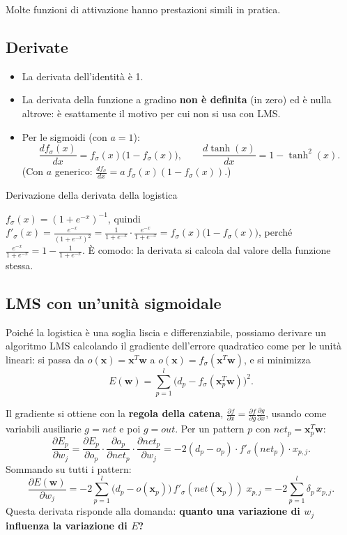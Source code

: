 Molte funzioni di attivazione hanno prestazioni simili in pratica.

\subsection{Derivate}\label{derivate}

\begin{itemize}
\tightlist
\item
  La derivata dell'identità è 1.
\item
  La derivata della funzione a gradino \textbf{non è definita} (in zero)
  ed è nulla altrove: è esattamente il motivo per cui non si usa con
  LMS.
\item
  Per le sigmoidi (con \(a = 1\)): \[
  \frac{df_\sigma(x)}{dx} = f_\sigma(x)\big(1 - f_\sigma(x)\big), \qquad \frac{d\tanh(x)}{dx} = 1 - \tanh^2(x).
  \] (Con \(a\) generico:
  \(\frac{df_\sigma}{dx} = a\,f_\sigma(x)(1 - f_\sigma(x))\).)
\end{itemize}

\begin{boxnote}{Derivazione della derivata della logistica}

\(f_\sigma(x) = (1 + e^{-x})^{-1}\), quindi
\(f'_\sigma(x) = \frac{e^{-x}}{(1 + e^{-x})^2} = \frac{1}{1 + e^{-x}} \cdot \frac{e^{-x}}{1 + e^{-x}} = f_\sigma(x)\big(1 - f_\sigma(x)\big)\),
perché \(\frac{e^{-x}}{1 + e^{-x}} = 1 - \frac{1}{1 + e^{-x}}\). È
comodo: la derivata si calcola dal valore della funzione stessa.

\end{boxnote}

\subsection{LMS con un'unità
sigmoidale}\label{lms-con-ununituxe0-sigmoidale}

Poiché la logistica è una soglia liscia e differenziabile, possiamo
derivare un algoritmo LMS calcolando il gradiente dell'errore quadratico
come per le unità lineari: si passa da
\(o(\mathbf{x}) = \mathbf{x}^T\mathbf{w}\) a
\(o(\mathbf{x}) = f_\sigma(\mathbf{x}^T\mathbf{w})\), e si minimizza \[
E(\mathbf{w}) = \sum_{p=1}^{l}\big(d_p - f_\sigma(\mathbf{x}_p^T\mathbf{w})\big)^2.
\]

Il gradiente si ottiene con la \textbf{regola della catena},
\(\frac{\partial f}{\partial x} = \frac{\partial f}{\partial g}\frac{\partial g}{\partial x}\),
usando come variabili ausiliarie \(g = net\) e poi \(g = out\). Per un
pattern \(p\) con \(net_p = \mathbf{x}_p^T\mathbf{w}\): \[
\frac{\partial E_p}{\partial w_j} = \frac{\partial E_p}{\partial o_p}\cdot\frac{\partial o_p}{\partial net_p}\cdot\frac{\partial net_p}{\partial w_j} = -2(d_p - o_p)\cdot f'_\sigma(net_p)\cdot x_{p,j}.
\] Sommando su tutti i pattern: \[
\frac{\partial E(\mathbf{w})}{\partial w_j} = -2\sum_{p=1}^{l}\big(d_p - o(\mathbf{x}_p)\big)\, f'_\sigma(net(\mathbf{x}_p))\; x_{p,j} = -2\sum_{p=1}^{l}\delta_p\, x_{p,j}.
\] Questa derivata risponde alla domanda: \textbf{quanto una variazione
di \(w_j\) influenza la variazione di \(E\)?}

